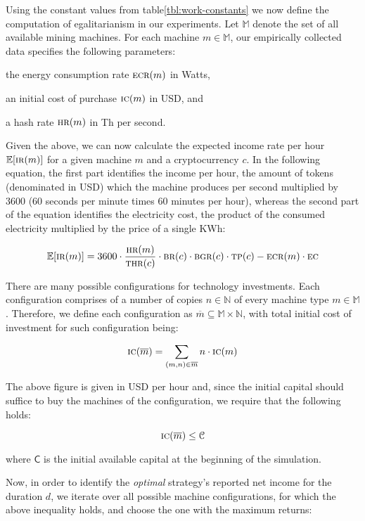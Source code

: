 
Using the constant values from table\ref{tbl:work-constants} we now define the
computation of egalitarianism in our experiments.  Let $\mathbb{M}$ denote the set of
all available mining machines. For each machine $m \in \mathbb{M}$, our empirically
collected data specifies the following parameters:
\begin{inparaenum}[i)]
    \item the energy consumption rate $\textsc{ecr}(m)$ in Watts,
    \item an initial cost of purchase $\textsc{ic}(m)$ in USD, and
    \item a hash rate $\textsc{hr}(m)$ in Th per second.
\end{inparaenum}
Given the above, we can now calculate the expected income rate per hour
$\mathbb{E}[\textsc{ir}(m)]$ for a given machine $m$ and a cryptocurrency $c$. In the
following equation, the first part identifies the income per hour, \ie the
amount of tokens (denominated in USD) which the machine produces per second
multiplied by $3600$ ($60$ seconds per minute times $60$ minutes per hour),
whereas the second part of the equation identifies the electricity cost, \ie
the product of the consumed electricity multiplied by the price of a single
KWh:

\[
\mathbb{E}[\textsc{ir}(m)] = 3600 \cdot \frac{\textsc{hr}(m)}{\textsc{thr}(c)} \cdot \textsc{br}(c) \cdot \textsc{bgr}(c) \cdot \textsc{tp}(c) - \textsc{ecr}(m) \cdot \textsc{ec}
\]

There are many possible configurations for technology investments. Each
configuration comprises of a number of copies $n \in \mathbb{N}$ of every
machine type $m \in \mathbb{M}$. Therefore, we define each configuration as
$\overline{m} \subseteq \mathbb{M} \times \mathbb{N}$, with
total initial cost of investment for such configuration being:

\[
  \textsc{ic}(\overline{m}) = \sum_{(m, n) \in \overline{m}}{n \cdot \textsc{ic}(m)}
\]

The above figure is given in USD per hour and, since the initial capital should
suffice to buy the machines of the configuration, we require that the following
holds:

\[
    \textsc{ic}(\overline{m}) \leq \mathcal{C}
\]

where $\mathsf{C}$ is the initial available capital at the beginning of the simulation.

Now, in order to identify the \emph{optimal} strategy's reported net income for the
duration $d$, we iterate over all possible machine configurations, for which
the above inequality holds, and choose the one with the maximum returns:

